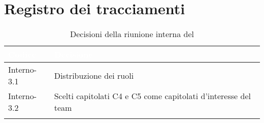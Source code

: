 \section{Registro dei tracciamenti}
{

\renewcommand{\arraystretch}{1.5}
\centering
\begin{longtable}{C{3cm} C{9cm}}
\textcolor{white}{\textbf{Codice}}&
\textcolor{white}{\textbf{Decisione}}\\	
\endhead
		
Interno-3.1 & Distribuzione dei ruoli\\

Interno-3.2 & Scelti capitolati C4 e C5 come capitolati d'interesse del team\\
		
\caption{Decisioni della riunione interna del \Data{}}
\end{longtable}
}
